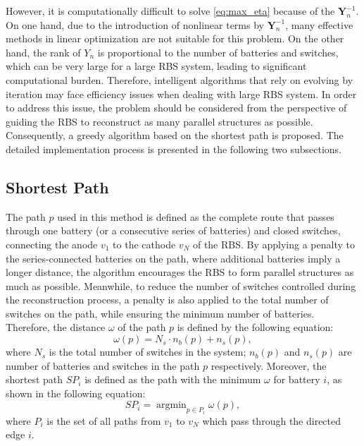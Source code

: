 \documentclass{article}
\begin{document}
However, it is computationally difficult to solve \ref{eq:max_eta} because of the $\bm{Y}_n^{-1}$.
On one hand, due to the introduction of nonlinear terms by $\bm{Y}_n^{-1}$, many effective methods in linear optimization are not suitable for this problem.
On the other hand, the rank of $Y_{n}$ is proportional to the number of batteries and switches, which can be very large for a large RBS system, leading to significant computational burden.
Therefore, intelligent algorithms that rely on evolving by iteration may face efficiency issues when dealing with large RBS system.
In order to address this issue, the problem should be considered from the perspective of guiding the RBS to reconstruct as many parallel structures as possible.
Consequently, a greedy algorithm based on the shortest path is proposed. 
The detailed implementation process is presented in the following two subsections.

\subsection{Shortest Path}

The path $p$ used in this method is defined as the complete route that passes through one battery (or a consecutive series of batteries) and closed switches, connecting the anode $v_1$ to the cathode $v_N$ of the RBS.
By applying a penalty to the series-connected batteries on the path, where additional batteries imply a longer distance, the algorithm encourages the RBS to form parallel structures as much as possible.
Meanwhile, to reduce the number of switches controlled during the reconstruction process, a penalty is also applied to the total number of switches on the path, while ensuring the minimum number of batteries.
Therefore, the distance $\omega$ of the path $p$ is defined by the following equation: 
\begin{equation}\label{eq:weight}
    \omega(p) = N_s \cdot n_b (p) + n_s (p),
\end{equation}
where $N_s$ is the total number of switches in the system; 
$n_b(p)$ and $n_s(p)$ are number of batteries and switches in the path $p$ respectively. 
Moreover, the shortest path $SP_i$ is defined as the path with the minimum $\omega$ for battery $i$, as shown in the following equation:
\begin{equation}\label{eq:def_sp}
    SP_i = \mathop{\arg\min}_{p \in P_i} \omega(p),
\end{equation}
where $P_i$ is the set of all paths from $v_1$ to $v_N$ which pass through the directed edge $i$.
\end{document}
